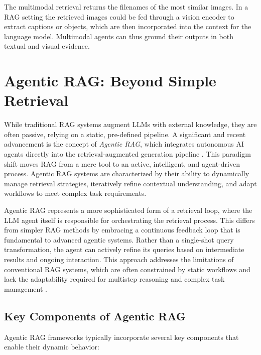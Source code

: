 The multimodal retrieval returns the filenames of the most similar images.  In a RAG setting the retrieved images could be fed through a vision encoder to extract captions or objects, which are then incorporated into the context for the language model.  Multimodal agents can thus ground their outputs in both textual and visual evidence.



\section{Agentic RAG: Beyond Simple Retrieval}
\label{sec:agentic_rag}

While traditional RAG systems augment LLMs with external knowledge, they are often passive, relying on a static, pre-defined pipeline. A significant and recent advancement is the concept of \textit{Agentic RAG}, which integrates autonomous AI agents directly into the retrieval-augmented generation pipeline \citep{singh2025agentic}. This paradigm shift moves RAG from a mere tool to an active, intelligent, and agent-driven process. Agentic RAG systems are characterized by their ability to dynamically manage retrieval strategies, iteratively refine contextual understanding, and adapt workflows to meet complex task requirements.

Agentic RAG represents a more sophisticated form of a retrieval loop, where the LLM agent itself is responsible for orchestrating the retrieval process. This differs from simpler RAG methods by embracing a continuous feedback loop that is fundamental to advanced agentic systems. Rather than a single-shot query transformation, the agent can actively refine its queries based on intermediate results and ongoing interaction. This approach addresses the limitations of conventional RAG systems, which are often constrained by static workflows and lack the adaptability required for multistep reasoning and complex task management \citep{singh2025agentic}.

\subsection{Key Components of Agentic RAG}

Agentic RAG frameworks typically incorporate several key components that enable their dynamic behavior:

